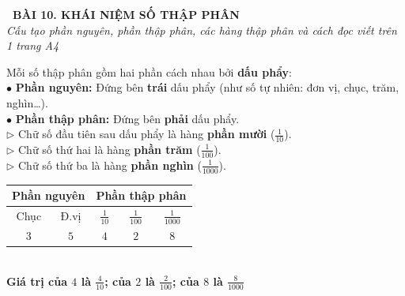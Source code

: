 \documentclass[14pt,a4paper,oneside]{extbook}
\begin{document}
\noindent
\begin{tcolorbox}[
  enhanced,
  colback=teal!8!white,
  colframe=teal!80!black,
  arc=3mm,
  boxrule=1.1pt,
  width=\linewidth,
  halign=center,
  top=2.2mm, bottom=2.2mm,
  left=3mm, right=3mm,
  drop fuzzy shadow
]
  {\large\bfseries\color{teal!95!black}\faBookmark\ BÀI 10. KHÁI NIỆM SỐ THẬP PHÂN}\\[2pt]
  {\scriptsize\color{black!75}\itshape Cấu tạo phần nguyên, phần thập phân, các hàng thập phân và cách đọc viết trên 1 trang A4}
\end{tcolorbox}

\vspace{3.2mm}
\noindent
\begin{minipage}[t]{0.58\textwidth}
  \begin{tcolorbox}[
    enhanced,
    title={\footnotesize\bfseries\color{white}\faKey\ 1. Cấu tạo của số thập phân},
    colback=blue!2!white,
    colframe=blue!75!black,
    arc=2.5mm, boxrule=0.8pt, top=1.8mm, bottom=1.8mm, left=2.2mm, right=2.2mm
  ]
    \footnotesize
    Mỗi số thập phân gồm hai phần cách nhau bởi \textbf{dấu phẩy}:\\
    $\bullet$ \textbf{Phần nguyên:} Đứng bên \textbf{trái} dấu phẩy (như số tự nhiên: đơn vị, chục, trăm, nghìn\dots).\\
    $\bullet$ \textbf{Phần thập phân:} Đứng bên \textbf{phải} dấu phẩy.\\
    $\triangleright$ Chữ số đầu tiên sau dấu phẩy là hàng \textbf{phần mười} ($\frac{1}{10}$).\\
    $\triangleright$ Chữ số thứ hai là hàng \textbf{phần trăm} ($\frac{1}{100}$).\\
    $\triangleright$ Chữ số thứ ba là hàng \textbf{phần nghìn} ($\frac{1}{1000}$).
  \end{tcolorbox}
\end{minipage}%
\hfill
\begin{minipage}[t]{0.40\textwidth}
  \begin{tcolorbox}[
    enhanced,
    title={\footnotesize\bfseries\color{white}\faEye\ Ví dụ phân tích số $35,428$},
    colback=teal!2!white,
    colframe=teal!75!black,
    arc=2.5mm, boxrule=0.8pt, top=1.8mm, bottom=1.8mm, left=1.5mm, right=1.5mm,
    halign=center
  ]
    \scriptsize
    \begin{tabular}{|c|c|c|c|c|}
      \hline
      \multicolumn{2}{|c|}{\textbf{Phần nguyên}} & \multicolumn{3}{c|}{\textbf{Phần thập phân}} \\ \hline
      Chục & Đ.vị & $\frac{1}{10}$ & $\frac{1}{100}$ & $\frac{1}{1000}$ \\ \hline
      $3$ & $5$ & $4$ & $2$ & $8$ \\ \hline
    \end{tabular}\\[3pt]
    {\tiny\color{teal!95!black}\bfseries Giá trị của $4$ là $\frac{4}{10}$; của $2$ là $\frac{2}{100}$; của $8$ là $\frac{8}{1000}$}
  \end{tcolorbox}
\end{minipage}
\end{document}
